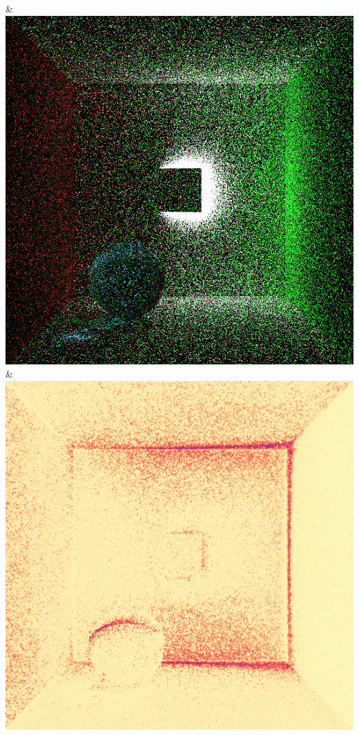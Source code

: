 & \includegraphics[width=\linewidth]{figures/py/tests/quality_comparison/sppm_1spp_ajar_caustic.png}
\\
& \includegraphics[width=\linewidth]{figures/py/tests/quality_comparison/pt_1spp_ajar_caustic_flip.png}
